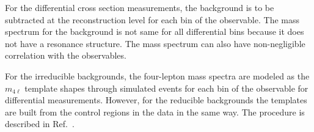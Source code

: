 For the differential cross section measurements, the background is to be subtracted at the reconstruction level for each bin
of the observable. The mass spectrum for the background is not same for all differential bins because it does not have a resonance structure. 
The mass spectrum can also have non-negligible correlation with the observables. 
\par 
For the irreducible backgrounds, the four-lepton mass spectra are modeled as the $m_{4\ell}$ template shapes through simulated events
for each bin of the observable for differential measurements. 
However, for the reducible backgrounds the templates are built from the control regions in the data in the same way. The procedure is described in Ref.~\cite{Chatrchyan:2013mxa}.
\par 
